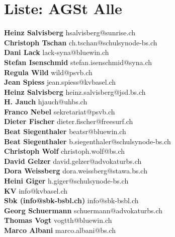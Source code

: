 \documentclass{scrartcl}
\begin{document}
\section*{Liste: AGSt Alle}
\textbf{Heinz Salvisberg } hsalvisberg@sunrise.ch\\
\textbf{Christoph Tschan } ch.tschan@schulsynode-bs.ch\\
\textbf{Dani Lack } lack-syna@bluewin.ch\\
\textbf{Stefan Isenschmid } stefan.isenschmid@syna.ch\\
\textbf{Regula Wild } wild@psvb.ch\\
\textbf{Jean Spiess } jean.spiess@kvbasel.ch\\
\textbf{Heinz Salvisberg } heinz.salvisberg@jsd.bs.ch\\
\textbf{H. Jauch } hjauch@uhbs.ch\\
\textbf{Franco Nebel } sekretariat@psvb.ch\\
\textbf{Dieter Fischer } dieter.fischer@freesurf.ch\\
\textbf{Beat Siegenthaler } beatsr@bluewin.ch\\
\textbf{Beat Siegenthaler } b.siegenthaler@schulsynode-bs.ch\\
\textbf{Christoph Wolf } christoph.wolf@bs.ch\\
\textbf{David Gelzer } david.gelzer@advokaturbs.ch\\
\textbf{Dora Weissberg } dora.weissberg@stawa.bs.ch\\
\textbf{Heini Giger } h.giger@schulsynode-bs.ch\\
\textbf{KV } info@kvbasel.ch\\
\textbf{Sbk (info@sbk-bsbl.ch) } info@sbk-bsbl.ch\\
\textbf{Georg Schuermann } schuermann@advokaturbs.ch\\
\textbf{Thomas Vogt } vogtth@bluewin.ch\\
\textbf{Marco Albani } marco.albani@bs.ch\\
\end{document}
